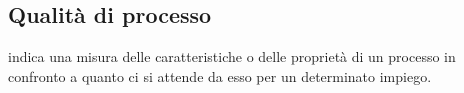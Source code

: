 
\subsection*{Qualità di processo}
indica una misura delle caratteristiche o delle proprietà di un processo in confronto a quanto ci si attende da esso per un determinato impiego.

